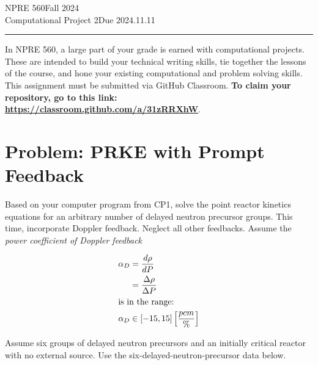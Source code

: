 \documentclass{article}
\newcommand{\class}{NPRE 560}
\newcommand{\term}{Fall 2024}
\newcommand{\assignment}{Computational Project 2}
\newcommand{\duedate}{2024.11.11}
\begin{document}
 


\class \hfill \term \\
\assignment \hfill Due \duedate\\
\rule[1ex]{\textwidth}{.1pt}


In \class, a large part of your grade is earned with computational projects. 
These are intended to build your technical writing skills, tie together the 
lessons of the course, and hone your existing computational and problem solving 
skills. This assignment must be submitted via GitHub Classroom. \textbf{To claim your 
repository, go to this link: \url{https://classroom.github.com/a/31zRRXhW}}.

\section{Problem: PRKE with Prompt Feedback}

Based on your computer program from CP1, solve the point reactor kinetics equations for an 
arbitrary number of delayed neutron precursor groups. This time, incorporate Doppler 
feedback. Neglect all other feedbacks. Assume the \emph{power coefficient of 
Doppler feedback}

\begin{align*}
        \alpha_D &= \frac{d \rho}{d P}\\
                 &= \frac{\Delta \rho}{\Delta P}\\
\intertext{is in the range:}
        \alpha_D &\in \left[-15, 15\right]\left[\frac{pcm}{\%}\right]\\
\end{align*}


Assume six groups of delayed neutron precursors and an initially critical reactor with no external source. 
Use the six-delayed-neutron-precursor data below.
\end{document}
